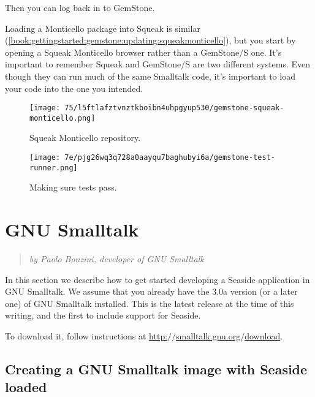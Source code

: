 \documentclass[a4paper,10pt,twoside]{book}
\newenvironment{blockquote}%
	{\begin{quote}}
	{\end{quote}}
\begin{document}
Then you can log back in to GemStone. 

Loading a Monticello package into Squeak is similar (\autoref{book:gettingstarted:gemstone:updating:squeakmonticello}), but you start by opening a Squeak Monticello browser rather than a GemStone$/$S one. It's important to remember Squeak and GemStone$/$S are two different systems. Even though they can run much of the same Smalltalk code, it's important to load your code into the one you intended.

\begin{figure}[h!tbp]
	\begin{center}
		\texttt{[image: 75/l5ftlafztvnztkboibn4uhpgyup530/gemstone-squeak-monticello.png]}
		\caption{Squeak Monticello repository.\label{book:gettingstarted:gemstone:updating:squeakmonticello}}
	\end{center}
\end{figure}


\begin{figure}[h!tbp]
	\begin{center}
		\texttt{[image: 7e/pjg26wq3q728a0aayqu7baghubyi6a/gemstone-test-runner.png]}
		\caption{Making sure tests pass.\label{book:gettingstarted:gemstone:updating:testrunner}}
	\end{center}
\end{figure}


\chapter{GNU Smalltalk}
\label{book:gettingstarted:gst}

\begin{blockquote}
\textit{by Paolo Bonzini, developer of GNU Smalltalk}

\end{blockquote}

In this section we describe how to get started developing a Seaside application in GNU Smalltalk. We assume that you already have the 3.0a version (or a later one) of GNU Smalltalk installed. This is the latest release at the time of this writing, and the first to include support for Seaside. 

To download it, follow instructions at \href{http://smalltalk.gnu.org/download}{http:$/$$/$smalltalk.gnu.org$/$download}.

\section{Creating a GNU Smalltalk image with Seaside loaded}
\label{book:gettingstarted:gst:loadseaside}
\end{document}
